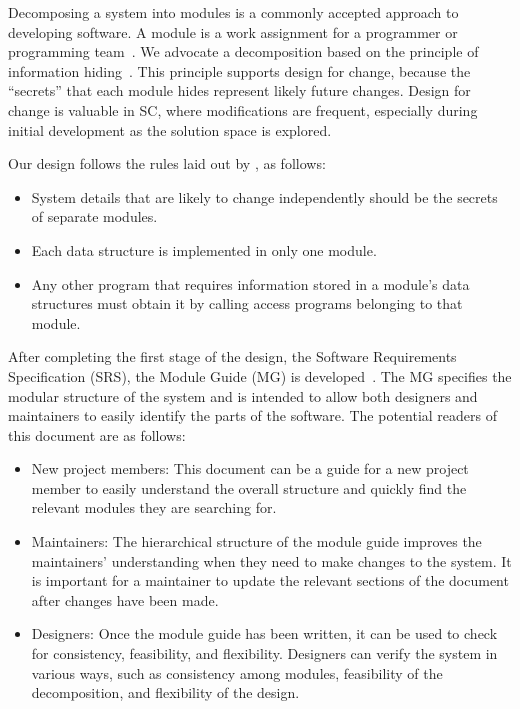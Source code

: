 \documentclass[12pt, titlepage]{article}
\begin{document}
Decomposing a system into modules is a commonly accepted approach to developing
software.  A module is a work assignment for a programmer or programming
team~\cite{ParnasEtAl1984}.  We advocate a decomposition based on the principle
of information hiding~\cite{Parnas1972a}.  This principle supports design for
change, because the ``secrets'' that each module hides represent likely future
changes.  Design for change is valuable in SC, where modifications are frequent,
especially during initial development as the solution space is explored.  

Our design follows the rules laid out by \cite{ParnasEtAl1984}, as follows:
\begin{itemize}
\item System details that are likely to change independently should be the
  secrets of separate modules.
\item Each data structure is implemented in only one module.
\item Any other program that requires information stored in a module's data
  structures must obtain it by calling access programs belonging to that module.
\end{itemize}

After completing the first stage of the design, the Software Requirements
Specification (SRS), the Module Guide (MG) is developed~\cite{ParnasEtAl1984}.
The MG specifies the modular structure of the system and is intended to allow
both designers and maintainers to easily identify the parts of the software.
The potential readers of this document are as follows:

\begin{itemize}
\item New project members: This document can be a guide for a new project member
  to easily understand the overall structure and quickly find the relevant
  modules they are searching for.
\item Maintainers: The hierarchical structure of the module guide improves the
  maintainers' understanding when they need to make changes to the system. It is
  important for a maintainer to update the relevant sections of the document
  after changes have been made.
\item Designers: Once the module guide has been written, it can be used to check
  for consistency, feasibility, and flexibility. Designers can verify the system
  in various ways, such as consistency among modules, feasibility of the
  decomposition, and flexibility of the design.
\end{itemize}
\end{document}
